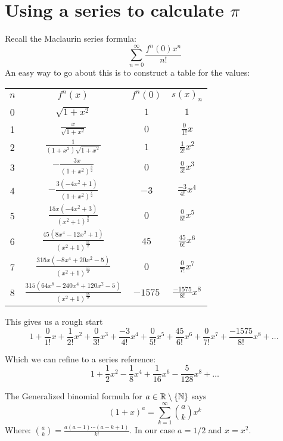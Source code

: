 \documentclass{article}
\begin{document}
\section{Using a series to calculate $\pi$}
    Recall the Maclaurin series formula:
    \[\sum_{n=0}^{\infty}\frac{f^n(0)x^n}{n!}\]
    An easy way to go about this is to construct a table for the values:
    \begin{center}
     \begin{tabular}{|| c | c | c | c ||}
     \hline
     $n$ & $f^n(x)$ & $f^n(0)$ & $s(x)_n$ \\ [0.5ex]
     0 & $\sqrt{1+x^2}$ & $1$ & $1$ \\
     1 & $\frac{x}{\sqrt{1+x^2}}$ & $0$ & $\frac{0}{1!}x$ \\
     2 & $\frac{1}{\left(1+x^2\right)\sqrt{1+x^2}}$ & $1$ & $\frac{1}{2!}x^2$ \\
     3 & $-\frac{3x}{\left(1+x^2\right)^{\frac{5}{2}}}$ & $0$ & $\frac{0}{3!}x^3$ \\
     4 & $-\frac{3\left(-4x^2+1\right)}{\left(1+x^2\right)^{\frac{7}{2}}}$ & $-3$ & $\frac{-3}{4!}x^4$ \\
     5 & $\frac{15x\left(-4x^2+3\right)}{\left(x^2+1\right)^{\frac{9}{2}}}$ & $0$ & $\frac{0}{5!}x^5$ \\
     6 & $\frac{45\left(8x^4-12x^2+1\right)}{\left(x^2+1\right)^{\frac{11}{2}}}$ & $45$ & $\frac{45}{6!}x^6$ \\
     7 & $\frac{315x\left(-8x^4+20x^2-5\right)}{\left(x^2+1\right)^{\frac{13}{2}}}$ & $0$ & $\frac{0}{7!}x^7$ \\
     8 & $\frac{315\left(64x^6-240x^4+120x^2-5\right)}{\left(x^2+1\right)^{\frac{15}{2}}}$ &
     $-1575$ & $\frac{-1575}{8!}x^8$ \\
     [1ex]
     \hline
    \end{tabular}
    \end{center}

    This gives us a rough start
    \[1+\frac{0}{1!}x+\frac{1}{2!}x^2+\frac{0}{3!}x^3+\frac{-3}{4!}x^4+\frac{0}{5!}x^5+\frac{45}{6!}x^6+\frac{0}{7!}x^7+\frac{-1575}{8!}x^8+\ldots \:\]

    Which we can refine to a series reference:
    \[1+\frac{1}{2}x^2-\frac{1}{8}x^4+\frac{1}{16}x^6-\frac{5}{128}x^8+\ldots \]

    The Generalized binomial formula for $a\in \Bbb R\setminus \{\Bbb N\}$ says
    \[(1+x)^a= \sum_{k=1}^{\infty}{a\choose k} x^k\]
    Where: ${{a\choose k} =\frac{a(a-1)\cdots(a-k+1)}{k!}}$. In our case $a=1/2$ and $x=x^2$.
\end{document}
